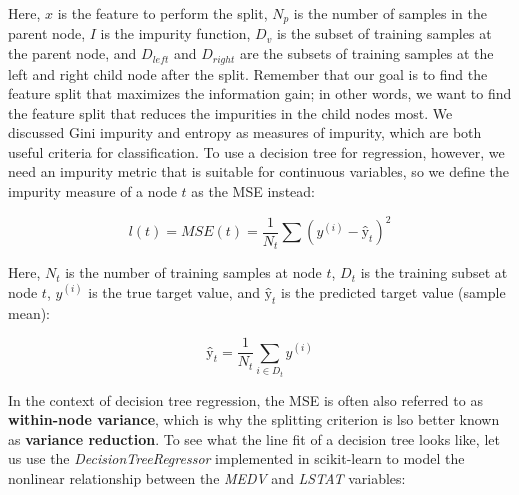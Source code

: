 \documentclass[11pt]{article}
\begin{document}
Here, \(x\) is the feature to perform the split, \(N_p\) is the number
of samples in the parent node, \(I\) is the impurity function, \(D_v\)
is the subset of training samples at the parent node, and \(D_{left}\)
and \(D_{right}\) are the subsets of training samples at the left and
right child node after the split. Remember that our goal is to find the
feature split that maximizes the information gain; in other words, we
want to find the feature split that reduces the impurities in the child
nodes most. We discussed Gini impurity and entropy as measures of
impurity, which are both useful criteria for classification. To use a
decision tree for regression, however, we need an impurity metric that
is suitable for continuous variables, so we define the impurity measure
of a node \(t\) as the MSE instead:

\[l(t) = MSE(t) = \frac{1}{N_t}\sum(y^{(i)} - ŷ_t)^2\]

Here, \(N_t\) is the number of training samples at node \(t\), \(D_t\)
is the training subset at node \(t\), \(y^{(i)}\) is the true target
value, and \(ŷ_t\) is the predicted target value (sample mean):

\[ŷ_t = \frac{1}{N_t}\sum_{i \in D_t}y^{(i)}\]

In the context of decision tree regression, the MSE is often also
referred to as \textbf{within-node variance}, which is why the splitting
criterion is lso better known as \textbf{variance reduction}. To see
what the line fit of a decision tree looks like, let us use the
\emph{DecisionTreeRegressor} implemented in scikit-learn to model the
nonlinear relationship between the \emph{MEDV} and \emph{LSTAT}
variables:
\end{document}
